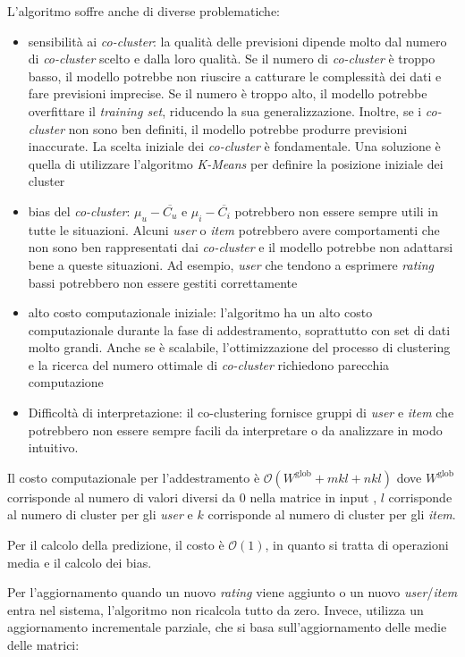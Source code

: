 L'algoritmo soffre anche di diverse problematiche:

\begin{itemize}
  \item sensibilità ai \textit{co-cluster}: la qualità delle previsioni dipende molto dal numero di \textit{co-cluster} scelto e dalla loro qualità. Se il numero di \textit{co-cluster} è troppo basso, il modello potrebbe non riuscire a catturare le complessità dei dati e fare previsioni imprecise. Se il numero è troppo alto, il modello potrebbe overfittare il \textit{training set}, riducendo la sua generalizzazione. Inoltre, se i \textit{co-cluster} non sono ben definiti, il modello potrebbe produrre previsioni inaccurate. La scelta iniziale dei \textit{co-cluster} è fondamentale. Una soluzione è quella di utilizzare l'algoritmo \textit{K-Means} per definire la posizione iniziale dei cluster
  \item bias del \textit{co-cluster}: $\mu_u - \overline{C_u} $ e $ \mu_i - \overline{C_i}$ potrebbero non essere sempre utili in tutte le situazioni. Alcuni \textit{user} o \textit{item} potrebbero avere comportamenti che non sono ben rappresentati dai \textit{co-cluster} e il modello potrebbe non adattarsi bene a queste situazioni. Ad esempio, \textit{user} che tendono a esprimere \textit{rating} bassi potrebbero non essere gestiti correttamente
  \item alto costo computazionale iniziale: l'algoritmo ha un alto costo computazionale durante la fase di addestramento, soprattutto con set di dati molto grandi. Anche se è scalabile, l'ottimizzazione del processo di clustering e la ricerca del numero ottimale di \textit{co-cluster} richiedono parecchia computazione
  \item Difficoltà di interpretazione: il co-clustering fornisce gruppi di \textit{user} e \textit{item} che potrebbero non essere sempre facili da interpretare o da analizzare in modo intuitivo.
\end{itemize}

Il costo computazionale per l'addestramento è $ \mathcal{O}(W^{\text{glob}} + mkl + nkl) $ dove $ W^{\text{glob}} $ corrisponde al numero di valori diversi da $0$ nella matrice in input , $l$ corrisponde al numero di cluster per gli \textit{user} e $k$ corrisponde al numero di cluster per gli \textit{item}.

Per il calcolo della predizione, il costo è $\mathcal{O}(1)$, in quanto si tratta di operazioni media e il calcolo dei bias.

Per l'aggiornamento quando un nuovo \textit{rating} viene aggiunto o un nuovo \textit{user}/\textit{item} entra nel sistema, l'algoritmo non ricalcola tutto da zero. Invece, utilizza un aggiornamento incrementale parziale, che si basa sull'aggiornamento delle medie delle matrici:

